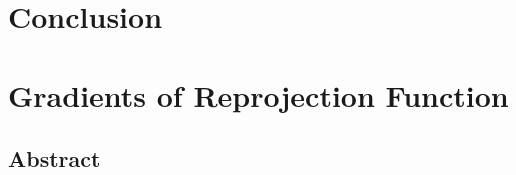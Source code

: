 \chapter*{Conclusion}%
\label{cha:conclusion}


\appendix

\chapter{Gradients of Reprojection Function}%
\label{cha:gradients_of_reprojection_function}



\backmatter%




\clearpage
\pagestyle{empty}


\clearpage
\section*{Abstract}


